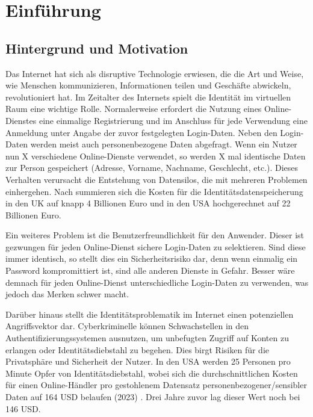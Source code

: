 \chapter{Einführung}
\label{cha:einfuehrung}

\section{Hintergrund und Motivation}
 
Das Internet hat sich als disruptive Technologie erwiesen, die die Art und Weise, wie Menschen kommunizieren, Informationen teilen und Geschäfte abwickeln, revolutioniert hat. Im Zeitalter des Internets spielt die Identität im virtuellen Raum eine wichtige Rolle. Normalerweise erfordert die Nutzung eines Online-Dienstes eine einmalige Registrierung und im Anschluss für jede Verwendung eine Anmeldung unter Angabe der zuvor festgelegten Login-Daten. Neben den Login-Daten werden meist auch personenbezogene Daten abgefragt. Wenn ein Nutzer nun X verschiedene Online-Dienste verwendet, so werden X mal identische Daten zur Person gespeichert (Adresse, Vorname, Nachname, Geschlecht, etc.). Dieses Verhalten verursacht die Entstehung von Datensilos, die mit mehreren Problemen einhergehen. Nach \cite{ID10} summieren sich die Kosten für die Identitätsdatenspeicherung in den UK auf knapp 4 Billionen Euro und in den USA hochgerechnet auf 22 Billionen Euro. 

Ein weiteres Problem ist die Benutzerfreundlichkeit für den Anwender. Dieser ist gezwungen für jeden Online-Dienst sichere Login-Daten zu selektieren. Sind diese immer identisch, so stellt dies ein Sicherheitsrisiko dar, denn wenn einmalig ein Password kompromittiert ist, sind alle anderen Dienste in Gefahr. Besser wäre demnach für jeden Online-Dienst unterschiedliche Login-Daten zu verwenden, was jedoch das Merken schwer macht.

Darüber hinaus stellt die Identitätsproblematik im Internet einen potenziellen Angriffsvektor dar. Cyberkriminelle können Schwachstellen in den Authentifizierungssystemen ausnutzen, um unbefugten Zugriff auf Konten zu erlangen oder Identitätsdiebstahl zu begehen. Dies birgt Risiken für die Privatsphäre und Sicherheit der Nutzer. In den USA werden 25 Personen pro Minute Opfer von Identitätsdiebstahl, wobei sich die durchschnittlichen Kosten für einen Online-Händler pro gestohlenem Datensatz personenbezogener/sensibler Daten auf 164 USD belaufen (2023) \cite{ID64}. Drei Jahre zuvor lag dieser Wert noch bei 146 USD.

